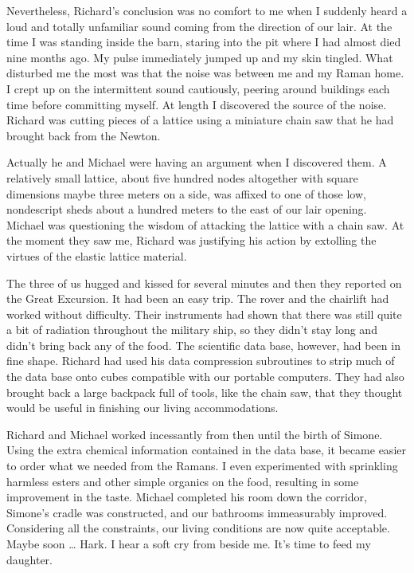 \documentclass[]{article}
\begin{document}
Nevertheless, Richard’s conclusion was no comfort to me when I suddenly heard a loud and totally unfamiliar sound coming from the direction of our lair. At the time I was standing inside the barn, staring into the pit where I had almost died nine months ago. My pulse immediately jumped up and my skin tingled. What disturbed me the most was that the noise was between me and my Raman home. I crept up on the intermittent sound cautiously, peering around buildings each time before committing myself. At length I discovered the source of the noise. Richard was cutting pieces of a lattice using a miniature chain saw that he had brought back from the Newton.

Actually he and Michael were having an argument when I discovered them. A relatively small lattice, about five hundred nodes altogether with square dimensions maybe three meters on a side, was affixed to one of those low, nondescript sheds about a hundred meters to the east of our lair opening. Michael was questioning the wisdom of attacking the lattice with a chain saw. At the moment they saw me, Richard was justifying his action by extolling the virtues of the elastic lattice material.

The three of us hugged and kissed for several minutes and then they reported on the Great Excursion. It had been an easy trip. The rover and the chairlift had worked without difficulty. Their instruments had shown that there was still quite a bit of radiation throughout the military ship, so they didn’t stay long and didn’t bring back any of the food. The scientific data base, however, had been in fine shape. Richard had used his data compression subroutines to strip much of the data base onto cubes compatible with our portable computers. They had also brought back a large backpack full of tools, like the chain saw, that they thought would be useful in finishing our living accommodations.

Richard and Michael worked incessantly from then until the birth of Simone. Using the extra chemical information contained in the data base, it became easier to order what we needed from the Ramans. I even experimented with sprinkling harmless esters and other simple organics on the food, resulting in some improvement in the taste. Michael completed his room down the corridor, Simone’s cradle was constructed, and our bathrooms immeasurably improved. Considering all the constraints, our living conditions are now quite acceptable. Maybe soon … Hark. I hear a soft cry from beside me. It’s time to feed my daughter.
\end{document}
